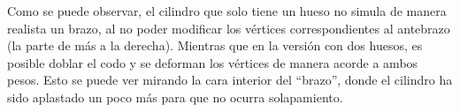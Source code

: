 \documentclass{article}
\begin{document}
Como se puede observar, el cilindro que solo tiene un hueso no simula de manera realista un brazo, al no poder modificar los vértices correspondientes al antebrazo (la parte de más a la derecha). Mientras que en la versión con dos huesos, es posible doblar el codo y se deforman los vértices de manera acorde a ambos pesos. Esto se puede ver mirando la cara interior del ``brazo'', donde el cilindro ha sido aplastado un poco más para que no ocurra solapamiento.



\end{document}
